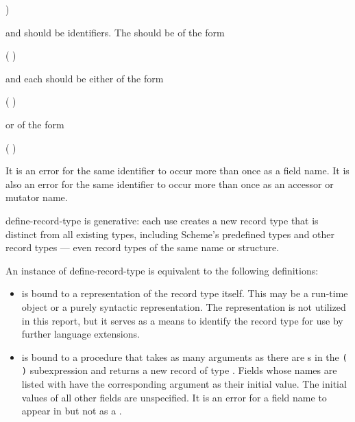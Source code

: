 \begin{entry}{%
)}

\syntax
{} and  should be identifiers.
The  should be of the form
\begin{scheme}
(  \dotsfoo)%
\end{scheme}
and each  should be either of the form
\begin{scheme}
( )%
\end{scheme}
or of the form
\begin{scheme}
(  )%
\end{scheme}

It is an error for the same identifier to occur more than once as a
field name.
It is also an error for the same identifier to occur more than once
as an accessor or mutator name.

{\cf define-record-type} is generative: each use creates a new record
type that is distinct from all existing types, including Scheme's
predefined types and other record types --- even record types of
the same name or structure.

An instance of {\cf define-record-type} is equivalent to the following
definitions:

\begin{itemize}

\item {} is bound to a representation of the record type itself.
This may be a run-time object or a purely syntactic representation.
The representation is not utilized in this report, but it serves as a
means to identify the record type for use by further language extensions.

\item {} is bound to a procedure that takes as
  many arguments as there are s in the
  \texttt{( \dotsfoo)} subexpression and returns a
  new record of type .  Fields whose names are listed with
   have the corresponding argument as their
  initial value.  The initial values of all other fields are
  unspecified.  It is an error for a field name to appear in
   but not as a .


\end{itemize}
\end{entry}
